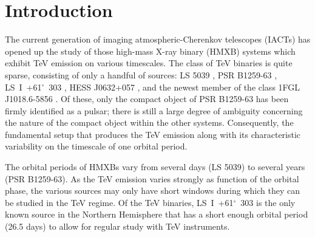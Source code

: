 \documentclass[preprint2]{aastex}
\newcommand{\lsi}{LS~I~+61$^{\circ}$~303}
\begin{document}
\keywords{}

\section{Introduction}

The current generation of imaging atmospheric-Cherenkov telescopes (IACTs) has opened up the study of those high-mass X-ray binary (HMXB) systems which exhibit TeV emission on various timescales. The class of TeV binaries is quite sparse, consisting of only a handful of sources: LS 5039 \citep{2005Sci...309..746A}, PSR B1259-63 \citep{2005A&A...442....1A}, \lsi{} \citep{Albert2006}, HESS J0632+057 \citep{2009ApJ...698L..94A}, and the newest member of the class 1FGL J1018.6-5856 \citep{2015arXiv150302711H}. Of these, only the compact object of PSR B1259-63 has been firmly identified as a pulsar; there is still a large degree of ambiguity concerning the nature of the compact object within the other systems. Consequently, the fundamental setup that produces the TeV emission along with its characteristic variability on the timescale of one orbital period.



The orbital periods of HMXBs vary from several days (LS 5039) to several years (PSR B1259-63). As the TeV emission varies strongly as function of the orbital phase, the various sources may only have short windows during which they can be studied in the TeV regime. Of the TeV binaries, \lsi{} is the only known source in the Northern Hemisphere that has a short enough orbital period (26.5 days) to allow for regular study with TeV instruments. 
\end{document}
